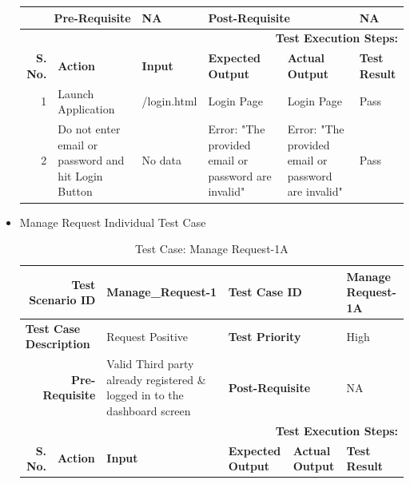 \documentclass[a4paper, hidelinks, 12pt]{report}
\begin{document}
\begin{itemize}
\begin{table}[H]
\begin{tabular}{|r|p{4.355em}|p{7.715em}|p{6.43em}|p{5.855em}|p{5.07em}|}
    \midrule
    \multicolumn{2}{|p{13.425em}|}{\textbf{Pre-Requisite}} & NA    & \multicolumn{2}{p{12.285em}|}{\textbf{Post-Requisite}} & NA \\
    \midrule
    \multicolumn{6}{p{38.495em}|}{\textbf{Test Execution Steps:}} \\
    \midrule
    \multicolumn{1}{|p{5.07em}|}{\textbf{S. No.}} & \textbf{Action } & \textbf{Input} & \textbf{Expected Output} & \textbf{Actual Output} & \textbf{Test Result} \\
    \midrule
    1     & Launch Application & /login.html & Login Page & Login Page & Pass \\
    \midrule
    2     & Do not enter email or password and hit Login Button & No data & Error: "The provided email or password are invalid" & Error: "The provided email or password are invalid" & Pass \\
    \bottomrule
    \end{tabular}%
  \label{tab:Test Case: Login-2A}%
\end{table}%
\item{Manage Request Individual Test Case}
\begin{table}[H]
  \centering
  \caption{Test Case: Manage Request-1A}
    \begin{tabular}{|r|p{4.355em}|p{7.715em}|p{6.43em}|p{5.855em}|p{5.07em}|}
    \toprule
    \multicolumn{2}{|p{13.425em}|}{\textbf{Test Scenario ID}} & Manage\_Request-1 & \multicolumn{2}{p{12.285em}|}{\textbf{Test Case ID}} & Manage Request-1A \\
    \midrule
    \multicolumn{2}{|l|}{\multirow{2}[2]{*}{\textbf{Test Case Description}}} & \multirow{2}[2]{*}{Request Positive} & \multicolumn{2}{l|}{\multirow{2}[2]{*}{\textbf{Test Priority}}} & \multirow{2}[2]{*}{High} \\
    \multicolumn{2}{|l|}{} & \multicolumn{1}{l|}{} & \multicolumn{2}{l|}{} & \multicolumn{1}{l|}{} \\
    \midrule
    \multicolumn{2}{|p{13.425em}|}{\textbf{Pre-Requisite}} & Valid Third party already registered \& logged in to the dashboard screen & \multicolumn{2}{p{12.285em}|}{\textbf{Post-Requisite}} & NA \\
    \midrule
    \multicolumn{6}{p{38.495em}|}{\textbf{Test Execution Steps:}} \\
    \midrule
    \multicolumn{1}{|p{5.07em}|}{\textbf{S. No.}} & \textbf{Action } & \textbf{Input} & \textbf{Expected Output} & \textbf{Actual Output} & \textbf{Test Result} \\

\end{tabular}
\end{table}
\end{itemize}
\end{document}
